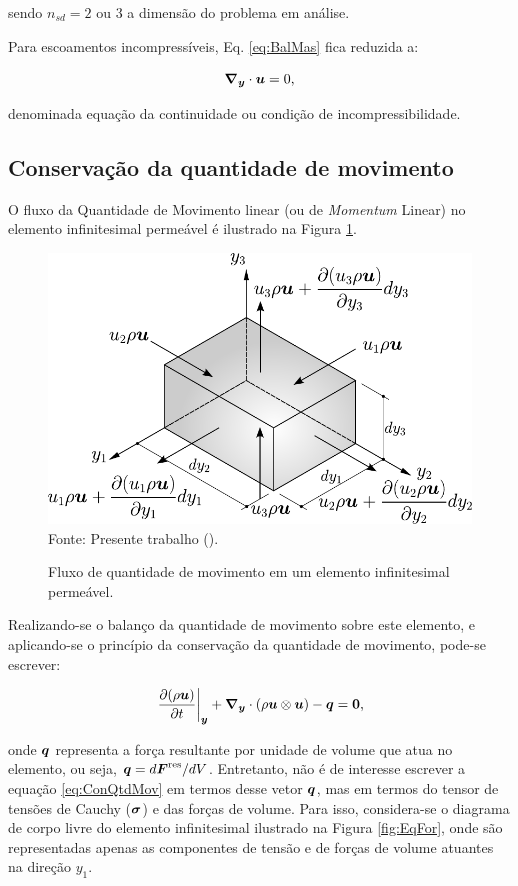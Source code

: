 \noindent sendo $n_{sd}=2$ ou $3$ a dimensão do problema em análise.

Para escoamentos incompressíveis, Eq. \eqref{eq:BalMas} fica reduzida a:

\begin{equation}
    \boldsymbol{\nabla_y}\cdot\boldsymbol{u}=0\text{,}\label{eq:incomp}
\end{equation}

\noindent denominada equação da continuidade ou condição de incompressibilidade.

\subsection{Conservação da quantidade de movimento}

O fluxo da Quantidade de Movimento linear (ou de \textit{Momentum} Linear) no elemento infinitesimal permeável é ilustrado na Figura \ref{fig:ConQtdMov}.

\begin{figure}[h!]
    \centering
    \caption{Fluxo de quantidade de movimento em um elemento infinitesimal permeável.}
    \includegraphics[width=.55\linewidth]{Figuras/ConQtdMov.pdf}
    \\Fonte: Presente trabalho (\the\year).
    \label{fig:ConQtdMov}
\end{figure}

Realizando-se o balanço da quantidade de movimento sobre este elemento, e aplicando-se o princípio da conservação da quantidade de movimento, pode-se escrever:

\begin{equation}
    \left.\frac{\partial{(\rho \boldsymbol{u})}}{\partial{t}}\right|_{\boldsymbol{y}}+\boldsymbol{\nabla_y}\cdot(\rho \boldsymbol{u}\otimes\boldsymbol{u})-\boldsymbol{q}=\boldsymbol{0}\text{,}
    \label{eq:ConQtdMov}
\end{equation}

\noindent onde $\boldsymbol{q}$ representa a força resultante por unidade de volume que atua no elemento, ou seja, $\boldsymbol{q}=d\boldsymbol{F}^\mathrm{res}/dV$. Entretanto, não é de interesse escrever a equação \eqref{eq:ConQtdMov} em termos desse vetor $\boldsymbol{q}$, mas em termos do tensor de tensões de Cauchy ($\boldsymbol{\sigma}$) e das forças de volume. Para isso, considera-se o diagrama de corpo livre do elemento infinitesimal ilustrado na Figura \ref{fig:EqFor}, onde são representadas apenas as componentes de tensão e de forças de volume atuantes na direção $y_1$.

